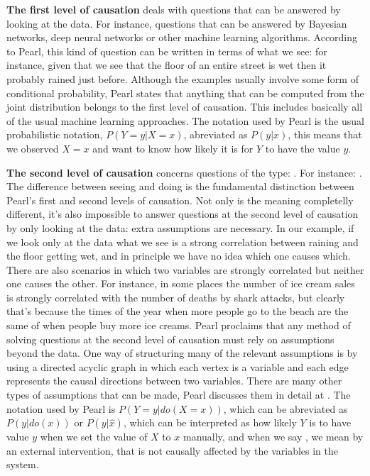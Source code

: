 \textbf{The first level of causation} deals with questions that can be answered by looking at the data. For instance, questions that can be answered by Bayesian networks, deep neural networks or other machine learning algorithms. According to Pearl, this kind of question can be written in terms of what we see: for instance, given that we see that the floor of an entire street is wet then it probably rained just before. Although the examples usually involve some form of conditional probability, Pearl states that anything that can be computed from the joint distribution belongs to the first level of causation. This includes basically all of the usual machine learning approaches. The notation used by Pearl is the usual probabilistic notation, $P(Y=y|X=x)$, abreviated as $P(y|x)$, this means that we observed $X=x$ and want to know how likely it is for $Y$ to have the value $y$.

\textbf{The second level of causation} concerns questions of the type: . For instance: . The difference between seeing and doing is the fundamental distinction between Pearl's first and second levels of causation. Not only is the meaning completelly different, it's also impossible to answer questions at the second level of causation by only looking at the data: extra assumptions are necessary. In our example, if we look only at the data what we see is a strong correlation between raining and the floor getting wet, and in principle we have no idea which one causes which. There are also scenarios in which two variables are strongly correlated but neither one causes the other. For instance, in some places the number of ice cream sales is strongly correlated with the number of deaths by  shark attacks, but clearly that's because the times of the year when more people go to the beach are the same of when people buy more ice creams. Pearl proclaims that any method of solving questions at the second level of causation must rely on assumptions beyond the data. One way of structuring many of the relevant assumptions is by using a directed acyclic graph in which each vertex is a variable and each edge represents the causal directions between two variables. There are many other types of assumptions that can be made, Pearl discusses them in detail at \cite{Causality}. The notation used by Pearl is $P(Y=y|do(X=x))$, which can be abreviated as $P(y|do(x))$ or $P(y|\hat{x})$, which can be interpreted as how likely $Y$ is to have value $y$ when we set the value of $X$ to $x$ manually, and when we say , we mean by an external intervention, that is not causally affected by the variables in the system. 

